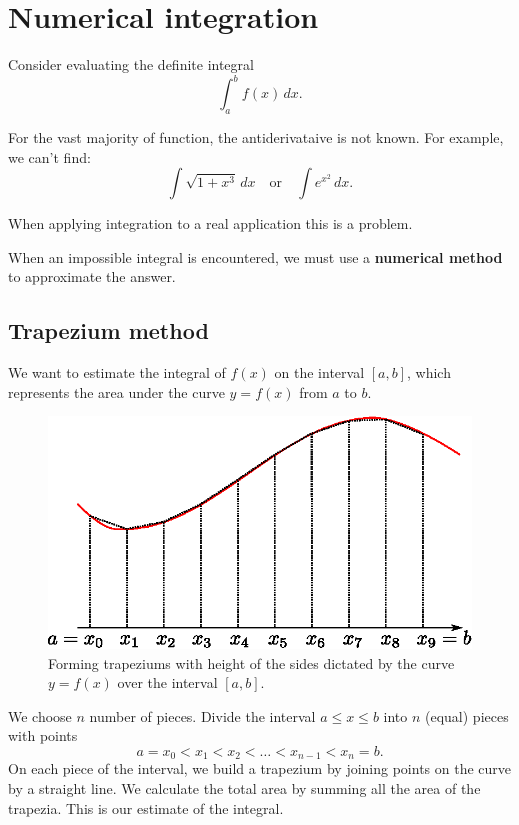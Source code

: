 \section{Numerical integration}

Consider evaluating the definite integral 
\[\int_a^bf(x)\,dx.\]

For the vast majority of function, the antiderivataive is not known. For example, we can't find:
\[\int\sqrt{1+x^3}\,dx\quad \text{or}\quad \int e^{x^2}\,dx.\]

When applying integration to a real application this is a problem.

When an impossible integral is encountered, we must use a \textbf{numerical method} to approximate the answer.

\subsection{Trapezium method}
We want to estimate the integral of $f(x)$ on the interval $[a,b]$, which represents the area under the curve $y=f(x)$ from $a$ to $b$.

\begin{figure}[H]
\centering
\includegraphics[scale=0.7]{img/trapezium-rule-integration}
\caption{Forming trapeziums with height of the sides dictated by the curve $y=f(x)$ over the interval $[a,b]$.}
\label{fig:trapezium-rule-integration}
\end{figure}

We choose $n$ number of pieces. Divide the interval $a\le x\le b$ into $n$ (equal) pieces with points
\[a=x_0<x_1<x_2<\dots<x_{n-1}<x_n=b.\]
On each piece of the interval, we build a trapezium by joining points on the curve by a straight line. We calculate the total area by summing all the area of the trapezia. This is our estimate of the integral.

